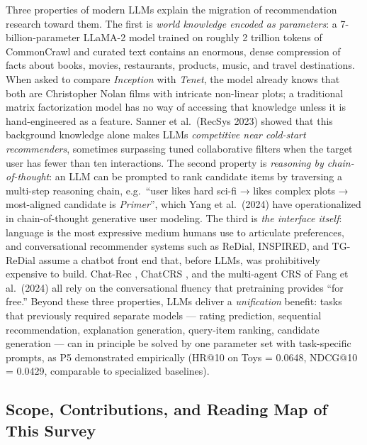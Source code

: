 \documentclass{article}
\begin{document}
Three properties of modern LLMs explain the migration of recommendation research toward them. The first is \emph{world knowledge encoded as parameters}: a 7-billion-parameter LLaMA-2 model trained on roughly 2 trillion tokens of CommonCrawl and curated text contains an enormous, dense compression of facts about books, movies, restaurants, products, music, and travel destinations. When asked to compare \emph{Inception} with \emph{Tenet}, the model already knows that both are Christopher Nolan films with intricate non-linear plots; a traditional matrix factorization model has no way of accessing that knowledge unless it is hand-engineered as a feature. Sanner et al.~(RecSys 2023) showed that this background knowledge alone makes LLMs \emph{competitive near cold-start recommenders}, sometimes surpassing tuned collaborative filters when the target user has fewer than ten interactions. The second property is \emph{reasoning by chain-of-thought}: an LLM can be prompted to rank candidate items by traversing a multi-step reasoning chain, e.g.~``user likes hard sci-fi → likes complex plots → most-aligned candidate is \emph{Primer}'', which Yang et al.~(2024) have operationalized in chain-of-thought generative user modeling. The third is \emph{the interface itself}: language is the most expressive medium humans use to articulate preferences, and conversational recommender systems such as ReDial, INSPIRED, and TG-ReDial assume a chatbot front end that, before LLMs, was prohibitively expensive to build. Chat-Rec \citep{gao2023chatrectowardsinte}, ChatCRS \citep{li2025grefergraphretriev}, and the multi-agent CRS of Fang et al.~(2024) all rely on the conversational fluency that pretraining provides ``for free.'' Beyond these three properties, LLMs deliver a \emph{unification} benefit: tasks that previously required separate models --- rating prediction, sequential recommendation, explanation generation, query-item ranking, candidate generation --- can in principle be solved by one parameter set with task-specific prompts, as P5 demonstrated empirically (HR@10 on Toys = 0.0648, NDCG@10 = 0.0429, comparable to specialized baselines).

\subsection{Scope, Contributions, and Reading Map of This Survey}\label{scope-contributions-and-reading-map-of-this-survey}
\end{document}
